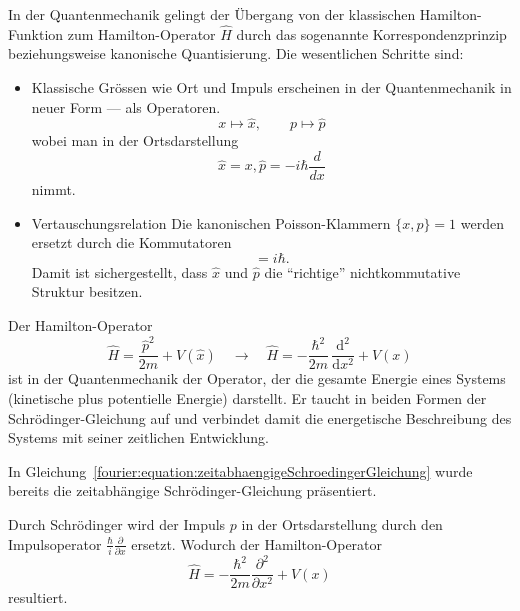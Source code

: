 In der Quantenmechanik gelingt der Übergang von der klassischen Hamilton-Funktion zum Hamilton-Operator $\hat H$ durch das sogenannte Korrespondenzprinzip beziehungsweise kanonische Quantisierung.
Die wesentlichen Schritte sind:
\begin{itemize}
\item Klassische Grössen wie Ort und Impuls erscheinen in der Quantenmechanik in neuer Form --- als Operatoren.
\begin{equation}
	x \longmapsto \hat{x}, \qquad p \longmapsto \hat{p}
\end{equation}
wobei man in der Ortsdarstellung
\begin{equation}
	\hat{x} = x, \hat{p} = -i \hbar \frac{d}{dx}
\end{equation}
nimmt.
\item Vertauschungsrelation
Die kanonischen Poisson-Klammern $\{x, p\} = 1$ werden ersetzt durch die Kommutatoren
\begin{equation}
	[\hat{x}, \hat{p}] = i \hbar.
\end{equation}
Damit ist sichergestellt, dass $\hat{x}$ und $\hat{p}$ die ``richtige'' nichtkommutative Struktur besitzen.

\end{itemize}
Der Hamilton-Operator
\begin{equation}\label{fourier:equation:hamiltonOperator}
 	\hat{H} = \frac{\hat p^2}{2m} + V(\hat{x})
    \quad\longrightarrow\quad
    \hat{H} = -\frac{\hbar^2}{2m}\,\frac{\mathrm{d}^2}{\mathrm{d}x^2} + V(x)
\end{equation}
ist in der Quantenmechanik der Operator, der die gesamte Energie eines Systems (kinetische plus potentielle Energie) darstellt.
Er taucht in beiden Formen der Schrödinger-Gleichung auf und verbindet damit die energetische Beschreibung des Systems mit seiner zeitlichen Entwicklung.

In Gleichung~\ref{fourier:equation:zeitabhaengigeSchroedingerGleichung} wurde bereits die zeitabhängige Schrödinger-Gleichung präsentiert. %


Durch Schrödinger wird der Impuls $p$ in der Ortsdarstellung durch den Impulsoperator $\frac{\hbar}{i} \frac{\partial}{\partial x}$
ersetzt.
Wodurch der Hamilton-Operator
\begin{equation}
	\hat{H} = -\frac{\hbar^2}{2m}\frac{\partial^2}{\partial x^2} + V(x)
\end{equation}	
resultiert.

